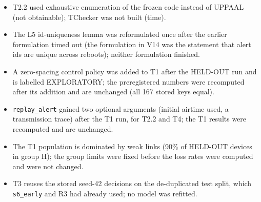 \begin{itemize}
\item T2.2 used exhaustive enumeration of the frozen code instead of UPPAAL (not obtainable); TChecker was not built (time).
\item The L5 id-uniqueness lemma was reformulated once after the earlier formulation timed out (the formulation in V14 was the statement that alert ids are unique across reboots); neither formulation finished.
\item A zero-spacing control policy was added to T1 after the HELD-OUT run and is labelled EXPLORATORY; the preregistered numbers were recomputed after its addition and are unchanged (all 167 stored keys equal).
\item \texttt{replay\_alert} gained two optional arguments (initial airtime used, a transmission trace) after the T1 run, for T2.2 and T4; the T1 results were recomputed and are unchanged.
\item The T1 population is dominated by weak links (90\% of HELD-OUT devices in group H); the group limits were fixed before the loss rates were computed and were not changed.
\item T3 reuses the stored seed-42 decisions on the de-duplicated test split, which \texttt{s6\_early} and R3 had already used; no model was refitted.
\end{itemize}

